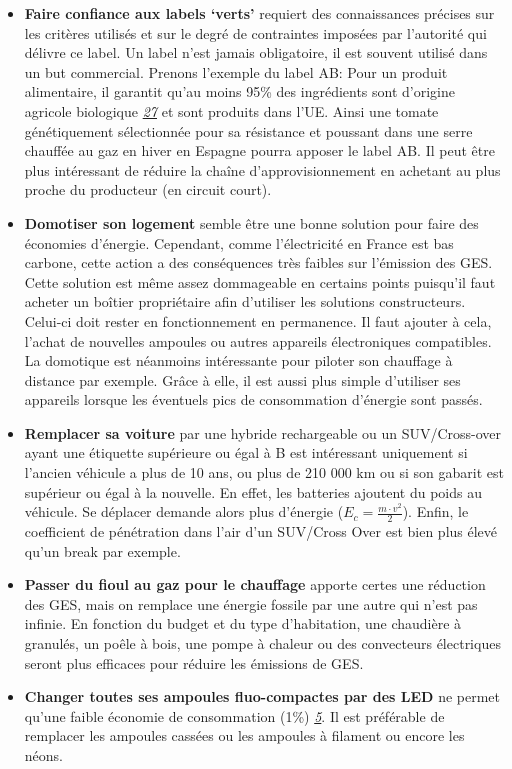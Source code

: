 \begin{itemize}
\tightlist
\item
  \textbf{Faire confiance aux labels `verts'} requiert des connaissances
  précises sur les critères utilisés et sur le degré de contraintes
  imposées par l'autorité qui délivre ce label. Un label n'est jamais
  obligatoire, il est souvent utilisé dans un but commercial. Prenons
  l'exemple du label AB: Pour un produit alimentaire, il garantit qu'au
  moins 95\% des ingrédients sont d'origine agricole biologique
  \emph{\href{https://www.agencebio.org/wp-content/uploads/2018/10/regles_usage_marque_AB.pdf}{27}}
  et sont produits dans l'UE. Ainsi une tomate génétiquement
  sélectionnée pour sa résistance et poussant dans une serre chauffée au
  gaz en hiver en Espagne pourra apposer le label AB. Il peut être plus
  intéressant de réduire la chaîne d'approvisionnement en achetant au
  plus proche du producteur (en circuit court).\\
\item
  \textbf{Domotiser son logement} semble être une bonne solution pour
  faire des économies d'énergie. Cependant, comme l'électricité en
  France est bas carbone, cette action a des conséquences très faibles
  sur l'émission des GES. Cette solution est même assez dommageable en
  certains points puisqu'il faut acheter un boîtier propriétaire afin
  d'utiliser les solutions constructeurs. Celui-ci doit rester en
  fonctionnement en permanence. Il faut ajouter à cela, l'achat de
  nouvelles ampoules ou autres appareils électroniques compatibles. La
  domotique est néanmoins intéressante pour piloter son chauffage à
  distance par exemple. Grâce à elle, il est aussi plus simple
  d'utiliser ses appareils lorsque les éventuels pics de consommation
  d'énergie sont passés.\\
\item
  \textbf{Remplacer sa voiture} par une hybride rechargeable ou un
  SUV/Cross-over ayant une étiquette supérieure ou égal à B est
  intéressant uniquement si l'ancien véhicule a plus de 10 ans, ou plus
  de 210 000 km ou si son gabarit est supérieur ou égal à la nouvelle.
  En effet, les batteries ajoutent du poids au véhicule. Se déplacer
  demande alors plus d'énergie (\(E_{c}=\frac{m \cdot v^2}{2}\)). Enfin,
  le coefficient de pénétration dans l'air d'un SUV/Cross Over est bien
  plus élevé qu'un break par exemple.\\
\item
  \textbf{Passer du fioul au gaz pour le chauffage} apporte certes une
  réduction des GES, mais on remplace une énergie fossile par une autre
  qui n'est pas infinie. En fonction du budget et du type d'habitation,
  une chaudière à granulés, un poêle à bois, une pompe à chaleur ou des
  convecteurs électriques seront plus efficaces pour réduire les
  émissions de GES.\\
\item
  \textbf{Changer toutes ses ampoules fluo-compactes par des LED} ne
  permet qu'une faible économie de consommation (1\%)
  \emph{\href{https://www.carbone4.com/publication-faire-sa-part}{5}}.
  Il est préférable de remplacer les ampoules cassées ou les ampoules à
  filament ou encore les néons.
\end{itemize}

